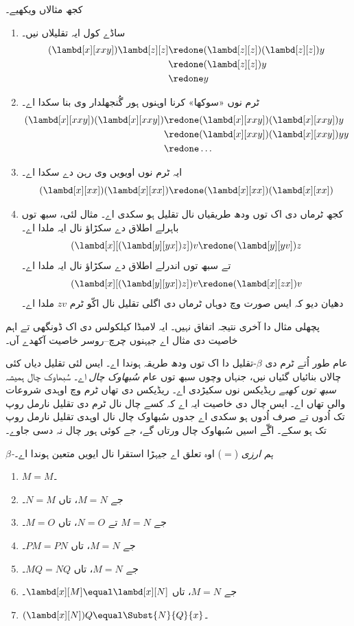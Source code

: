 \documentclass[../../../include/open-logic-section]{subfiles}
\begin{document}
کجھ مثالاں ویکھیے۔
\begin{enumerate}
\item ساڈے کول ایہ تقلیلاں نیں۔
\begin{align*}
(\lambd[x][xxy]) \lambd[z][z] & \redone (\lambd[z][z])(\lambd[z][z]) y \\
& \redone (\lambd[z][z]) y \\
& \redone y
\end{align*}
\item ٹرم نوں «سوکھا» کرنا اوہنوں ہور گُنجھلدار وی بنا سکدا اے۔
\begin{align*}
(\lambd[x][xxy])(\lambd[x][xxy]) & \redone (\lambd[x][xxy])(\lambd[x][xxy])y \\
& \redone (\lambd[x][xxy])(\lambd[x][xxy])yy \\
& \redone \dots
\end{align*}
\item ایہ ٹرم نوں اویویں وی رہن دے سکدا اے۔
\[
(\lambd[x][xx])(\lambd[x][xx]) \redone (\lambd[x][xx])(\lambd[x][xx])
\]
\item کجھ ٹرماں دی اک توں ودھ طریقیاں نال تقلیل ہو سکدی اے۔
  مثال لئی، سبھ توں باہرلے اطلاق دے سکڑاؤ نال ایہ ملدا اے۔
\[
(\lambd[x][(\lambd[y][yx]) z]) v \redone (\lambd[y][yv]) z
\]
تے سبھ توں اندرلے اطلاق دے سکڑاؤ نال ایہ ملدا اے۔
\[
(\lambd[x][(\lambd[y][yx]) z]) v \redone (\lambd[x][zx]) v
\]
دھیان دیو کہ ایس صورت وچ دوہاں ٹرماں دی اگلی تقلیل نال
اکّو ٹرم $zv$ ملدا اے۔
\end{enumerate}

پچھلی مثال دا آخری نتیجہ اتفاق نہیں۔ ایہ لامبڈا کیلکولس دی
اک ڈونگھی تے اہم خاصیت دی مثال اے جیہنوں چرچ–روسر خاصیت
آکھدے آں۔

\begin{digress}
  عام طور اُتے ٹرم دی $\beta$-تقلیل دا اک توں ودھ طریقہ ہوندا
  اے۔ ایس لئی تقلیل دیاں کئی چالاں بنائیاں گئیاں نیں، جنہاں
  وچوں سبھ توں عام \emph{سُبھاوک چال} اے۔ سُبھاوک چال ہمیشہ
  \emph{سبھ توں کھبے} ریڈیکس نوں سکیڑدی اے۔ ریڈیکس دی تھاں
  ٹرم وچ اوہدی شروعات والی تھاں اے۔ ایس چال دی خاصیت ایہ اے
  کہ کسے چال نال ٹرم دی تقلیل نارمل روپ تک اُدوں تے صرف اُدوں
  ہو سکدی اے جدوں سُبھاوک چال نال اوہدی تقلیل نارمل روپ تک
  ہو سکے۔ اگّے اسیں سُبھاوک چال ورتاں گے، جے کوئی ہور چال نہ
  دسی جاوے۔
\end{digress}

\begin{defn}
  \emph{$\beta$-ہم ارزی} ($\equal$) اوہ تعلق اے جیہڑا استقرا نال
  ایویں متعین ہوندا اے۔
  \begin{enumerate}
  \item $M \equal M$۔
  \item جے $M \equal N$، تاں $N \equal M$۔
  \item جے $M \equal N$ تے $N \equal O$، تاں $M \equal O$۔
  \item جے $M \equal N$، تاں $PM \equal PN$۔
  \item جے $M \equal N$، تاں $MQ \equal NQ$۔
  \item جے $M \equal N$، تاں $\lambd[x][M] \equal \lambd[x][N]$۔
  \item $(\lambd[x][N])Q \equal \Subst{N}{Q}{x}$۔
  \end{enumerate}
\end{defn}
\end{document}
